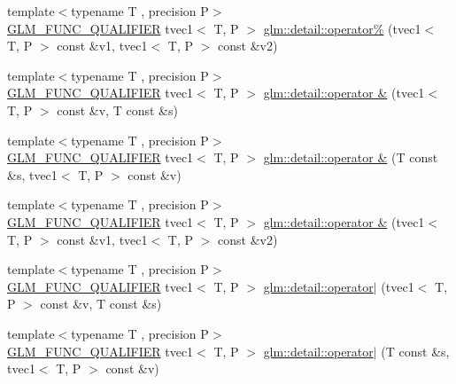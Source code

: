 \begin{DoxyCompactItemize}
\item 
{\footnotesize template$<$typename T , precision P$>$ }\\\hyperlink{setup_8hpp_a33fdea6f91c5f834105f7415e2a64407}{G\+L\+M\+\_\+\+F\+U\+N\+C\+\_\+\+Q\+U\+A\+L\+I\+F\+I\+ER} tvec1$<$ T, P $>$ \hyperlink{namespaceglm_1_1detail_a3f1fdb145b333fddf471702c219b4737}{glm\+::detail\+::operator\%} (tvec1$<$ T, P $>$ const \&v1, tvec1$<$ T, P $>$ const \&v2)
\item 
{\footnotesize template$<$typename T , precision P$>$ }\\\hyperlink{setup_8hpp_a33fdea6f91c5f834105f7415e2a64407}{G\+L\+M\+\_\+\+F\+U\+N\+C\+\_\+\+Q\+U\+A\+L\+I\+F\+I\+ER} tvec1$<$ T, P $>$ \hyperlink{namespaceglm_1_1detail_a9ebc8203edb99cd7ccd863387d8ec7fa}{glm\+::detail\+::operator \&} (tvec1$<$ T, P $>$ const \&v, T const \&s)
\item 
{\footnotesize template$<$typename T , precision P$>$ }\\\hyperlink{setup_8hpp_a33fdea6f91c5f834105f7415e2a64407}{G\+L\+M\+\_\+\+F\+U\+N\+C\+\_\+\+Q\+U\+A\+L\+I\+F\+I\+ER} tvec1$<$ T, P $>$ \hyperlink{namespaceglm_1_1detail_ac87a28d164ba62e7a9b3289762884837}{glm\+::detail\+::operator \&} (T const \&s, tvec1$<$ T, P $>$ const \&v)
\item 
{\footnotesize template$<$typename T , precision P$>$ }\\\hyperlink{setup_8hpp_a33fdea6f91c5f834105f7415e2a64407}{G\+L\+M\+\_\+\+F\+U\+N\+C\+\_\+\+Q\+U\+A\+L\+I\+F\+I\+ER} tvec1$<$ T, P $>$ \hyperlink{namespaceglm_1_1detail_ab196e666badab2ab438b6476d7efa152}{glm\+::detail\+::operator \&} (tvec1$<$ T, P $>$ const \&v1, tvec1$<$ T, P $>$ const \&v2)
\item 
{\footnotesize template$<$typename T , precision P$>$ }\\\hyperlink{setup_8hpp_a33fdea6f91c5f834105f7415e2a64407}{G\+L\+M\+\_\+\+F\+U\+N\+C\+\_\+\+Q\+U\+A\+L\+I\+F\+I\+ER} tvec1$<$ T, P $>$ \hyperlink{namespaceglm_1_1detail_a4ad36ce88c5018e4c367bc16ff10af03}{glm\+::detail\+::operator$\vert$} (tvec1$<$ T, P $>$ const \&v, T const \&s)
\item 
{\footnotesize template$<$typename T , precision P$>$ }\\\hyperlink{setup_8hpp_a33fdea6f91c5f834105f7415e2a64407}{G\+L\+M\+\_\+\+F\+U\+N\+C\+\_\+\+Q\+U\+A\+L\+I\+F\+I\+ER} tvec1$<$ T, P $>$ \hyperlink{namespaceglm_1_1detail_ab9758b2f8e0a176cf8f719aa5611839d}{glm\+::detail\+::operator$\vert$} (T const \&s, tvec1$<$ T, P $>$ const \&v)
\item 

\end{DoxyCompactItemize}
